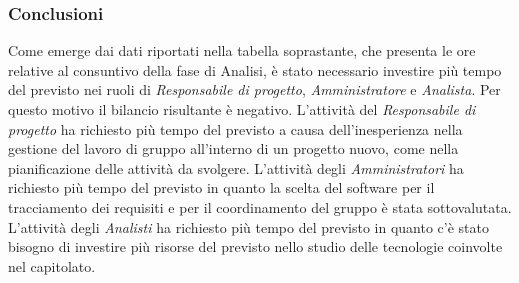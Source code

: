 \subsubsection{Conclusioni}
Come emerge dai dati riportati nella tabella soprastante, che presenta le ore relative al consuntivo della fase di Analisi, è stato necessario investire più tempo del previsto nei ruoli di \textit{Responsabile di progetto}, \textit{Amministratore} e \textit{Analista}. Per questo motivo il bilancio risultante è negativo. L'attività del \textit{Responsabile di progetto} ha richiesto più tempo del previsto a causa dell'inesperienza nella gestione del lavoro di gruppo all'interno di un progetto  nuovo, come nella pianificazione delle attività da svolgere. L'attività degli \textit{Amministratori} ha richiesto più tempo del previsto in quanto la scelta del software per il tracciamento dei requisiti e per il coordinamento del gruppo è stata sottovalutata. L'attività degli \textit{Analisti} ha richiesto più tempo del previsto in quanto c'è stato bisogno di investire più risorse del previsto nello studio delle tecnologie coinvolte nel capitolato. 